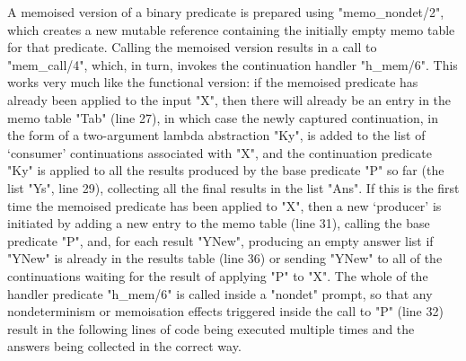 A memoised version of a binary predicate is 
prepared using "memo_nondet/2", which creates a new mutable reference containing the initially
empty memo table for that predicate. Calling the memoised version results in a call to "mem_call/4", 
which, in turn, invokes the continuation handler "h_mem/6". This works very much like the
 functional version: if the memoised predicate has already been applied to
the input "X", then there will already be an entry in the memo table "Tab" (line 27), in which case the
newly captured continuation, in the form of a two-argument lambda abstraction "Ky", is added to the 
list of `consumer' continuations associated with "X", and the continuation predicate "Ky" is applied to all
the results produced by the base predicate "P" so far (the list "Ys", line 29), collecting all the 
final results in the list "Ans". If this is the first time the memoised predicate has been applied to 
"X", then a new `producer' is initiated  by adding a new entry to the memo table (line 31), calling the base
predicate "P", and, for each result "YNew", producing an empty answer list if "YNew" is 
already in the results table (line 36) or sending "YNew" to all of the continuations waiting for the
result of applying "P" to "X". The whole of the handler predicate "h_mem/6" is called inside a
"nondet" prompt, so that any nondeterminism or memoisation effects triggered inside the call to "P" 
(line 32) result in the following lines of code being executed multiple times and the answers being collected
in the correct way.

